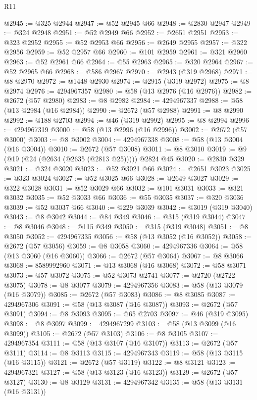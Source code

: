 \begin{lexlean}{R11}
\begin{coremodule}
@2945 := @325 @2944
@2947 := @52 @2945 @66
@2948 := @2830 @2947
@2949 := @324 @2948
@2951 := @52 @2949 @66
@2952 := @2651 @2951
@2953 := @323 @2952
@2955 := @52 @2953 @66
@2956 := @2649 @2955
@2957 := @322 @2956
@2959 := @52 @2957 @66
@2960 := @101 @2959
@2961 := @321 @2960
@2963 := @52 @2961 @66
@2964 := @55 @2963
@2965 := @320 @2964
@2967 := @52 @2965 @66
@2968 := @586 @2967
@2970 := @2943 (@319 @2968)
@2971 := @8 @2970
@2972 := @1448 @2930
@2974 := @2915 (@319 @2972)
@2975 := @8 @2974
@2976 := 4294967357
@2980 := @58 (@13 @2976 (@16 @2976))
@2982 := @2672 (@57 @2980)
@2983 := @8 @2982
@2984 := 4294967337
@2988 := @58 (@13 @2984 (@16 @2984))
@2990 := @2672 (@57 @2988)
@2991 := @8 @2990
@2992 := @188 @2703
@2994 := @46 (@319 @2992)
@2995 := @8 @2994
@2996 := 4294967319
@3000 := @58 (@13 @2996 (@16 @2996))
@3002 := @2672 (@57 @3000)
@3003 := @8 @3002
@3004 := 4294967338
@3008 := @58 (@13 @3004 (@16 @3004))
@3010 := @2672 (@57 @3008)
@3011 := @8 @3010
@3019 := @9 (@19 (@24 (@2634 (@2635 (@2813 @25))))) @2824 @45
@3020 := @2830 @329
@3021 := @324 @3020
@3023 := @52 @3021 @66
@3024 := @2651 @3023
@3025 := @323 @3024
@3027 := @52 @3025 @66
@3028 := @2649 @3027
@3029 := @322 @3028
@3031 := @52 @3029 @66
@3032 := @101 @3031
@3033 := @321 @3032
@3035 := @52 @3033 @66
@3036 := @55 @3035
@3037 := @320 @3036
@3039 := @52 @3037 @66
@3040 := @229 @3039
@3042 := @3019 (@319 @3040)
@3043 := @8 @3042
@3044 := @84 @349
@3046 := @315 (@319 @3044)
@3047 := @8 @3046
@3048 := @115 @349
@3050 := @315 (@319 @3048)
@3051 := @8 @3050
@3052 := 4294967335
@3056 := @58 (@13 @3052 (@16 @3052))
@3058 := @2672 (@57 @3056)
@3059 := @8 @3058
@3060 := 4294967336
@3064 := @58 (@13 @3060 (@16 @3060))
@3066 := @2672 (@57 @3064)
@3067 := @8 @3066
@3068 := 8589992960
@3071 := @13 @3068 (@16 @3068)
@3072 := @58 @3071
@3073 := @57 @3072
@3075 := @52 @3073 @2741
@3077 := @2720 (@2722 @3075)
@3078 := @8 @3077
@3079 := 4294967356
@3083 := @58 (@13 @3079 (@16 @3079))
@3085 := @2672 (@57 @3083)
@3086 := @8 @3085
@3087 := 4294967306
@3091 := @58 (@13 @3087 (@16 @3087))
@3093 := @2672 (@57 @3091)
@3094 := @8 @3093
@3095 := @65 @2703
@3097 := @46 (@319 @3095)
@3098 := @8 @3097
@3099 := 4294967299
@3103 := @58 (@13 @3099 (@16 @3099))
@3105 := @2672 (@57 @3103)
@3106 := @8 @3105
@3107 := 4294967354
@3111 := @58 (@13 @3107 (@16 @3107))
@3113 := @2672 (@57 @3111)
@3114 := @8 @3113
@3115 := 4294967343
@3119 := @58 (@13 @3115 (@16 @3115))
@3121 := @2672 (@57 @3119)
@3122 := @8 @3121
@3123 := 4294967321
@3127 := @58 (@13 @3123 (@16 @3123))
@3129 := @2672 (@57 @3127)
@3130 := @8 @3129
@3131 := 4294967342
@3135 := @58 (@13 @3131 (@16 @3131))

\end{coremodule}
\end{lexlean}
